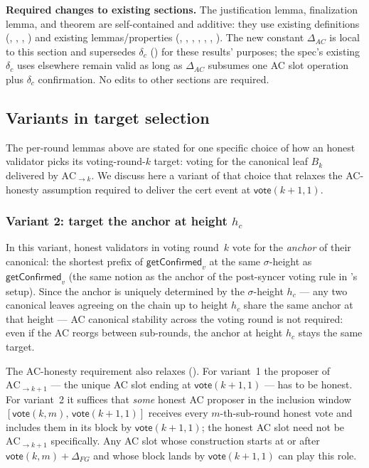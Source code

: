 \ifx\litemode\undefined\documentclass{article}\fi
\newcommand{\vote}{\ensuremath{\mathsf{vote}}}
\newcommand{\getConfirmed}{\textsf{getConfirmed}\xspace}
\renewcommand{\paragraph}[1]{\vspace{7pt}\noindent\textbf{#1}}
\theoremstyle{plain}
\theoremstyle{definition}
\theoremstyle{remark}
\begin{document}
\paragraph{Required changes to existing sections.}
The justification lemma, finalization lemma, and theorem are self-contained and additive: they use existing definitions (, , , ) and existing lemmas/properties (, , , , , , ). The new constant $\Delta_{\mathit{AC}}$ is local to this section and supersedes $\delta_c$ () for these results' purposes; the spec's existing $\delta_c$ uses elsewhere remain valid as long as $\Delta_{\mathit{AC}}$ subsumes one AC slot operation plus $\delta_c$ confirmation. No edits to other sections are required.

\subsection{Variants in target selection}\label{sec:liveness-variants}

The per-round lemmas above are stated for one specific choice of how an honest validator picks its voting-round-$k$ target: voting for the canonical leaf $B_k$ delivered by $\mathrm{AC}_{\to k}$. We discuss here a variant of that choice that relaxes the AC-honesty assumption required to deliver the cert event at $\vote(k{+}1, 1)$.

\subsubsection{Variant 2: target the anchor at height $h_c$}
In this variant, honest validators in voting round~$k$ vote for the \emph{anchor} of their canonical: the shortest prefix of $\getConfirmed_v$ at the same $\sigma$-height as $\getConfirmed_v$ (the same notion as the anchor of the post-syncer voting rule in 's setup).
Since the anchor is uniquely determined by the $\sigma$-height $h_c$ --- any two canonical leaves agreeing on the chain up to height $h_c$ share the same anchor at that height --- AC canonical stability across the voting round is not required: even if the AC reorgs between sub-rounds, the anchor at height $h_c$ stays the same target.

The AC-honesty requirement also relaxes ().
For variant~1 the proposer of $\mathrm{AC}_{\to k+1}$ --- the unique AC slot ending at $\vote(k{+}1, 1)$ --- has to be honest.
For variant~2 it suffices that \emph{some} honest AC proposer in the inclusion window $[\vote(k, m),\, \vote(k{+}1, 1)]$ receives every $m$-th-sub-round honest vote and includes them in its block by $\vote(k{+}1, 1)$; the honest AC slot need not be $\mathrm{AC}_{\to k+1}$ specifically.
Any AC slot whose construction starts at or after $\vote(k, m) + \Delta_{\mathit{FG}}$ and whose block lands by $\vote(k{+}1, 1)$ can play this role.
\end{document}
